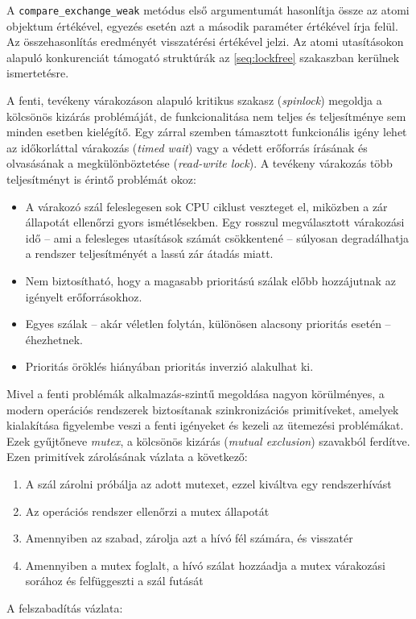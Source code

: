     
    A \texttt{compare\_exchange\_weak} metódus első argumentumát hasonlítja össze az atomi objektum értékével, egyezés esetén azt a második paraméter értékével írja felül. Az összehasonlítás eredményét visszatérési értékével jelzi. Az atomi utasításokon alapuló konkurenciát támogató struktúrák az \ref{seq:lockfree} szakaszban kerülnek ismertetésre.
    
    A fenti, tevékeny várakozáson alapuló kritikus szakasz (\emph{spinlock}) megoldja a kölcsönös kizárás problémáját, de funkcionalitása nem teljes és teljesítménye sem minden esetben kielégítő. Egy zárral szemben támasztott funkcionális igény lehet az időkorláttal várakozás (\emph{timed wait}) vagy a védett erőforrás írásának és olvasásának a megkülönböztetése (\emph{read-write lock}). A tevékeny várakozás több teljesítményt is érintő problémát okoz:
    
    \begin{itemize} 
        \item A várakozó szál feleslegesen sok CPU ciklust veszteget el, miközben a zár állapotát ellenőrzi gyors ismétlésekben. Egy rosszul megválasztott várakozási idő -- ami a felesleges utasítások számát csökkentené -- súlyosan degradálhatja a rendszer teljesítményét a lassú zár átadás miatt.
        \item Nem biztosítható, hogy a magasabb prioritású szálak előbb hozzájutnak az igényelt erőforrásokhoz.
        \item Egyes szálak -- akár véletlen folytán, különösen alacsony prioritás esetén -- éhezhetnek.
        \item Prioritás öröklés hiányában prioritás inverzió alakulhat ki.
    \end{itemize}
%
    Mivel a fenti problémák alkalmazás-szintű megoldása nagyon körülményes, a modern operációs rendszerek biztosítanak szinkronizációs primitíveket, amelyek kialakítása figyelembe veszi a fenti igényeket és kezeli az ütemezési problémákat. Ezek gyűjtőneve \emph{mutex}, a kölcsönös kizárás (\emph{mutual exclusion}) szavakból ferdítve. Ezen primitívek zárolásának vázlata a következő:
    
    \begin{enumerate}
        \item A szál zárolni próbálja az adott mutexet, ezzel kiváltva egy rendszerhívást
        \item Az operációs rendszer ellenőrzi a mutex állapotát
        \item Amennyiben az szabad, zárolja azt a hívó fél számára, és visszatér
        \item Amennyiben a mutex foglalt, a hívó szálat hozzáadja a mutex várakozási sorához és felfüggeszti a szál futását
    \end{enumerate}
%    
    A felszabadítás vázlata:
    
